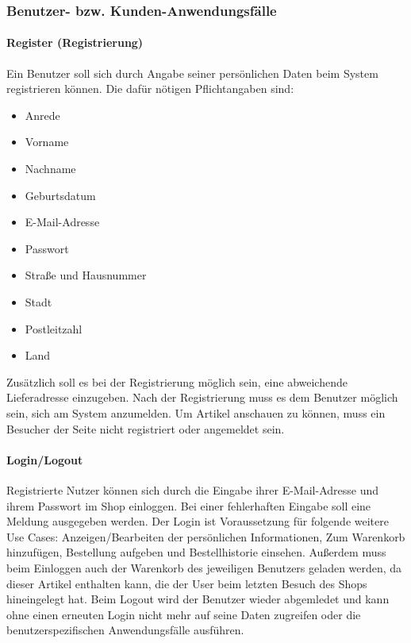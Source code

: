 \subsubsection{Benutzer- bzw. Kunden-Anwendungsfälle}
\paragraph{Register (Registrierung)}$\;$ \\
Ein Benutzer soll sich durch Angabe seiner persönlichen Daten beim System registrieren können.
Die dafür nötigen Pflichtangaben sind:
\begin{itemize}
\item Anrede
\item Vorname
\item Nachname
\item Geburtsdatum
\item E-Mail-Adresse
\item Passwort
\item Straße und Hausnummer
\item Stadt
\item Postleitzahl
\item Land
\end{itemize}
Zusätzlich soll es bei der Registrierung möglich sein, eine abweichende Lieferadresse einzugeben.
Nach der Registrierung muss es dem Benutzer möglich sein, sich am System anzumelden.
Um Artikel anschauen zu können, muss ein Besucher der Seite nicht registriert oder angemeldet sein.

\paragraph{Login/Logout}$\;$ \\
Registrierte Nutzer können sich durch die Eingabe ihrer E-Mail-Adresse und ihrem Passwort im Shop einloggen.
Bei einer fehlerhaften Eingabe soll eine Meldung ausgegeben werden.
Der Login ist Voraussetzung für folgende weitere Use Cases: Anzeigen/Bearbeiten der persönlichen Informationen, Zum Warenkorb hinzufügen, Bestellung aufgeben und Bestellhistorie einsehen.
Außerdem muss beim Einloggen auch der Warenkorb des jeweiligen Benutzers geladen werden, da dieser Artikel enthalten kann, die der User beim letzten Besuch des Shops hineingelegt hat.
Beim Logout wird der Benutzer wieder abgemledet und kann ohne einen erneuten Login nicht mehr auf seine Daten zugreifen oder die benutzerspezifischen Anwendungsfälle ausführen.

